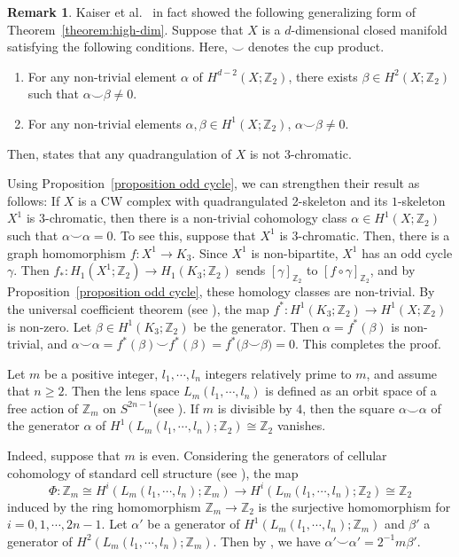 \documentclass[11pt, amsfonts]{amsart}
\numberwithin{equation}{section}
\theoremstyle{definition}
\newtheorem{remark}[thm]{Remark}
\theoremstyle{remark}
\newcommand{\ZZ}{\mathbb{Z}}
\begin{document}
\begin{remark} \label{remark kaiser}
Kaiser et al.~\cite{Kaiseretal} in fact showed the following generalizing form of Theorem~\ref{theorem:high-dim}. Suppose that $X$ is a $d$-dimensional closed manifold satisfying the following conditions. Here, $\smile$ denotes the cup product.
\begin{enumerate}[(1)]
\item For any non-trivial element $\alpha$ of $H^{d-2}(X; \ZZ_2)$, there exists $\beta \in H^2(X; \ZZ_2)$ such that $\alpha \smile \beta \ne 0$.

\item For any non-trivial elements $\alpha, \beta \in H^1(X; \ZZ_2)$, $\alpha \smile \beta \ne 0$.
\end{enumerate}
Then, \cite[Theorem~4.1]{Kaiseretal} states that any quadrangulation of $X$ is not 3-chromatic.

Using Proposition~\ref{proposition odd cycle}, we can strengthen
their result \cite[Theorem~4.1]{Kaiseretal} as follows: If $X$ is a CW complex with quadrangulated 2-skeleton and its $1$-skeleton $X^1$ is $3$-chromatic, then there is a non-trivial cohomology class $\alpha \in H^1(X;\ZZ_2)$ such that $\alpha \smile \alpha = 0$. To see this, suppose that $X^1$ is $3$-chromatic. Then, there is a graph homomorphism $f \colon X^1 \to K_3$. Since $X^1$ is non-bipartite, $X^1$ has an odd cycle $\gamma$. Then $f_* \colon H_1(X^1; \ZZ_2) \to H_1(K_3; \ZZ_2)$ sends $[\gamma]_{\ZZ_2}$ to $[f \circ \gamma]_{\ZZ_2}$, and by Proposition~\ref{proposition odd cycle}, these homology classes are non-trivial. By the universal coefficient theorem (see \cite[Section~3.1]{Hatcher}), the map $f^* \colon H^1(K_3; \ZZ_2) \to H^1(X; \ZZ_2)$ is non-zero. Let $\beta \in H^1(K_3; \ZZ_2)$ be the generator. Then $\alpha = f^*(\beta)$ is non-trivial, and $\displaystyle \mbox{$\alpha \smile \alpha = f^*(\beta) \smile f^*(\beta)$} = \mbox{$f^*(\beta \smile \beta$)} = 0$. This completes the proof.

Let $m$ be a positive integer, $l_1, \cdots, l_n$ integers relatively prime to $m$, and assume that $n \ge 2$. Then the lens space $L_m(l_1, \cdots, l_n)$ is defined as an orbit space of a free action of $\ZZ_m$ on $S^{2n-1}$(see \cite[Example~2.43]{Hatcher}). If $m$ is divisible by $4$, then the square $\alpha \smile \alpha$ of the generator $\alpha$ of $H^1(L_m(l_1, \cdots, l_n); \ZZ_2) \cong \ZZ_2$ vanishes.

Indeed, suppose that $m$ is even. Considering the generators of cellular cohomology of standard cell structure (see \cite[Example~2.43]{Hatcher}), the map
\[\Phi \colon \ZZ_m \cong H^i(L_m(l_1, \cdots, l_n); \ZZ_m) \to H^i(L_m(l_1, \cdots, l_n); \ZZ_2) \cong \ZZ_2\]
induced by the ring homomorphism $\ZZ_m \to \ZZ_2$ is the surjective homomorphism for $i = 0,1, \cdots, 2n - 1$. Let $\alpha'$ be a generator of $H^1(L_m(l_1, \cdots, l_n); \ZZ_m)$ and $\beta'$ a generator of $H^2(L_m(l_1, \cdots, l_n); \ZZ_m)$. Then by \cite[Example~2.43]{Hatcher}, we have $\alpha' \smile \alpha' = 2^{-1}m \beta'$.


\end{remark}
\end{document}
